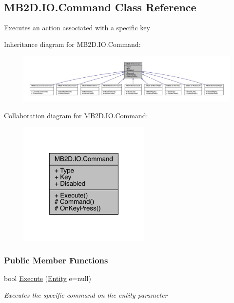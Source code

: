 \hypertarget{class_m_b2_d_1_1_i_o_1_1_command}{}\subsection{M\+B2\+D.\+I\+O.\+Command Class Reference}
\label{class_m_b2_d_1_1_i_o_1_1_command}


Executes an action associated with a specific key  




Inheritance diagram for M\+B2\+D.\+I\+O.\+Command\+:
\nopagebreak
\begin{figure}[H]
\begin{center}
\leavevmode
\includegraphics[width=350pt]{class_m_b2_d_1_1_i_o_1_1_command__inherit__graph}
\end{center}
\end{figure}


Collaboration diagram for M\+B2\+D.\+I\+O.\+Command\+:
\nopagebreak
\begin{figure}[H]
\begin{center}
\leavevmode
\includegraphics[width=186pt]{class_m_b2_d_1_1_i_o_1_1_command__coll__graph}
\end{center}
\end{figure}
\subsubsection*{Public Member Functions}
\begin{DoxyCompactItemize}
\item 
bool \hyperlink{class_m_b2_d_1_1_i_o_1_1_command_a59f97dd5810dd5b112c82ad3758da7e8}{Execute} (\hyperlink{class_m_b2_d_1_1_entity_component_1_1_entity}{Entity} e=null)
\begin{DoxyCompactList}\small\item\em Executes the specific command on the entity parameter \end{DoxyCompactList}\end{DoxyCompactItemize}
